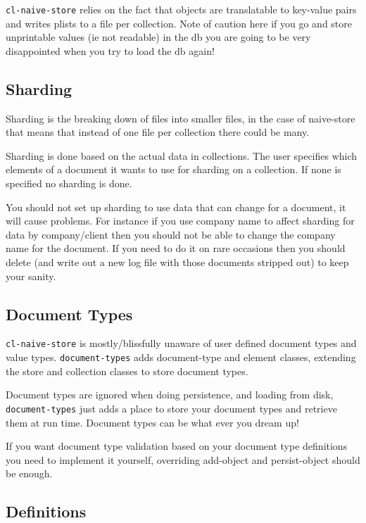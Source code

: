 \documentclass[11pt]{article}
\begin{document}
\texttt{cl-naive-store} relies on the fact that objects are translatable to
key-value pairs and writes plists to a file per collection. Note of
caution here if you go and store unprintable values (ie not readable)
in the db you are going to be very disappointed when you try to load
the db again!

\subsection{Sharding}
\label{sec:orgaf34aaf}

Sharding is the breaking down of files into smaller files, in the case
of naive-store that means that instead of one file per collection there
could be many.

Sharding is done based on the actual data in collections. The user
specifies which elements of a document it wants to use for sharding on
a collection. If none is specified no sharding is done.

You should not set up sharding to use data that can change for a
document, it will cause problems. For instance if you use company
name to affect sharding for data by company/client then you should not
be able to change the company name for the document. If you need to do
it on rare occasions then you should delete (and write out a new log
file with those documents stripped out) to keep your sanity.

\subsection{Document Types}
\label{sec:orgae8c579}

\texttt{cl-naive-store} is mostly/blissfully unaware of user defined document
types and value types. \texttt{document-types} adds document-type and element
classes, extending the store and collection classes to store document
types.

Document types are ignored when doing persistence, and loading from
disk, \texttt{document-types} just adds a place to store your document
types and retrieve them at run time. Document types can be what ever
you dream up!

If you want document type validation based on your document type
definitions you need to implement it yourself, overriding add-object
and persist-object should be enough.

\subsection{Definitions}
\label{sec:orgf7feb43}
\end{document}
